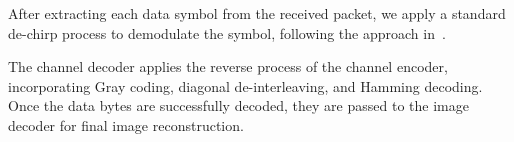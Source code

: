 After extracting each data symbol from the received packet, we apply a standard
de-chirp process to demodulate the symbol, following the approach in~\cite{TSN23}.


The channel decoder applies the reverse process of the channel encoder,
incorporating Gray coding, diagonal de-interleaving, and Hamming decoding.
Once the data bytes are successfully decoded, they are passed to the image decoder
for final image reconstruction.
